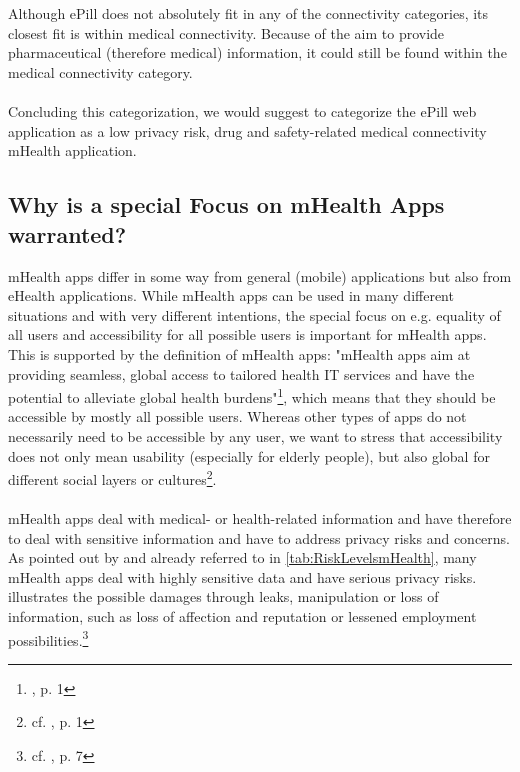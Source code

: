 \\
\\
Although ePill does not absolutely fit in any of the connectivity categories, its closest fit is within medical connectivity. Because of the aim to provide pharmaceutical (therefore medical) information, it could still be found within the medical connectivity category.
\\
\\
Concluding this categorization, we would suggest to categorize the ePill web application as a low privacy risk, drug and safety-related medical connectivity mHealth application.

\subsection{Why is a special Focus on mHealth Apps warranted?}
mHealth apps differ in some way from general (mobile) applications but also from eHealth applications. While mHealth apps can be used in many different situations and with very different intentions, the special focus on e.g. equality of all users and accessibility for all possible users is important for mHealth apps. This is supported by the definition of mHealth apps: "mHealth apps aim at providing seamless, global access to tailored health IT services and have the potential to alleviate global health burdens"\footnote{\cite{Dehling.2013}, p. 1}, which means that they should be accessible by mostly all possible users. Whereas other types of apps do not necessarily need to be accessible by any user, we want to stress that accessibility does not only mean usability (especially for elderly people), but also global for different social layers or cultures\footnote{cf. \cite{Dehling.2013}, p. 1}.
\\
\\
mHealth apps deal with medical- or health-related information and have therefore to deal with sensitive information and have to address privacy risks and concerns. As pointed out by \cite{Njie.2013} and already referred to in \ref{tab:RiskLevelsmHealth}, many mHealth apps deal with highly sensitive data and have serious privacy risks. \cite{Dehling.2013} illustrates the possible damages through leaks, manipulation or loss of information, such as loss of affection and reputation or lessened employment possibilities.\footnote{cf. \cite{Dehling.2013}, p. 7}
